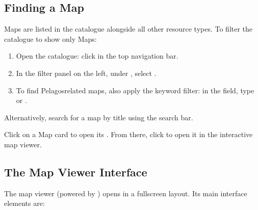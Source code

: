 \documentclass[letterpaper,10pt,english]{sphinxmanual}
\begin{document}
\subsection{Finding a Map}
\label{\detokenize{en/04_exploring_maps:finding-a-map}}
\sphinxAtStartPar
Maps are listed in the catalogue alongside all other resource types. To filter the
catalogue to show only Maps:
\begin{enumerate}
%
\item {} 
\sphinxAtStartPar
Open the catalogue: click  in the top navigation bar.

\item {} 
\sphinxAtStartPar
In the filter panel on the left, under , select .

\item {} 
\sphinxAtStartPar
To find Pelagos\sphinxhyphen{}related maps, also apply the keyword filter:
in the  field, type  or .

\end{enumerate}

\sphinxAtStartPar
Alternatively, search for a map by title using the search bar.

\sphinxAtStartPar
Click on a Map card to open its . From there, click  to open
it in the interactive map viewer.


\subsection{The Map Viewer Interface}
\label{\detokenize{en/04_exploring_maps:the-map-viewer-interface}}
\sphinxAtStartPar
The map viewer (powered by ) opens in a full\sphinxhyphen{}screen layout.
Its main interface elements are:
\end{document}
